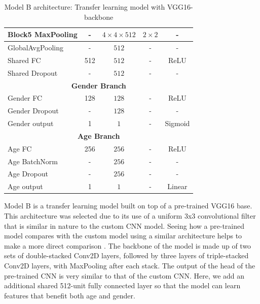 \documentclass[11pt,a4paper]{article}
\begin{document}
\begin{table}[h!]
\begin{tabular}{||l|c|c|c|c||}
 Block5 MaxPooling  & -    & $4 \times 4 \times 512$     & $2 \times 2$ & -     \\
 \hline
 GlobalAvgPooling   & -    & $512$                       & -           & -     \\
 Shared FC          & 512  & $512$                       & -           & ReLU  \\
 Shared Dropout     & -    & $512$                       & -           & -     \\
 \hline\hline
 \multicolumn{5}{||c||}{\textbf{Gender Branch}} \\
 \hline
 Gender FC          & 128  & $128$                       & -           & ReLU    \\
 Gender Dropout     & -    & $128$                       & -           & -       \\
 Gender output      & 1    & $1$                         & -           & Sigmoid \\
 \hline\hline
 \multicolumn{5}{||c||}{\textbf{Age Branch}} \\
 \hline
 Age FC             & 256  & $256$                       & -           & ReLU    \\
 Age BatchNorm      & -    & $256$                       & -           & -       \\
 Age Dropout        & -    & $256$                       & -           & -       \\
 Age output         & 1    & $1$                         & -           & Linear  \\
 \hline
\end{tabular}
\caption{Model B architecture: Transfer learning model with VGG16-backbone}
\label{table3}
\end{table}

Model B is a transfer learning model built on top of a pre-trained VGG16 base. This architecture was selected due to its use of a uniform 3x3 convolutional filter that is similar in nature to the custom CNN model. Seeing how a pre-trained model compares with the custom model using a similar architecture helps to make a more direct comparison \cite{rothe2018deep}. The backbone of the model is made up of two sets of double-stacked Conv2D layers, followed by three layers of triple-stacked Conv2D layers, with MaxPooling after each stack. The output of the head of the pre-trained CNN is very similar to that of the custom CNN. Here, we add an additional shared 512-unit fully connected layer so that the model can learn features that benefit both age and gender.
\end{document}
